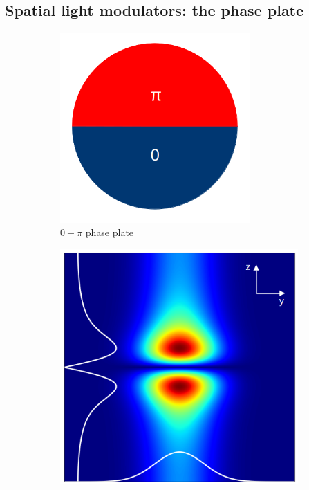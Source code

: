 \subsection{Spatial light modulators: the phase plate}
\label{sec:slm_phaseplate}
\begin{figure}
    \begin{subfigure}[t]{0.4\textwidth}
        \centering
        \includegraphics[width=0.8\textwidth, valign=c]{chapters/chapter_2/figures/0pi}
        \caption{$0-\pi$ phase plate}
        \label{fig:0pi_plate}
    \end{subfigure}
    \hfill
    \begin{subfigure}[t]{0.6\textwidth}
        \centering
        \includegraphics[height=\textwidth, valign=c]{chapters/chapter_2/figures/tem10_sim.png}

\end{subfigure}
\end{figure}
